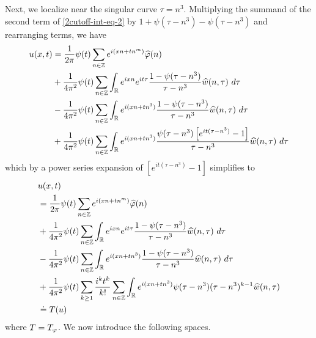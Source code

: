 %
%
%
%
%
Next, we localize near the singular curve $\tau =  n^3$.  Multiplying the
summand of the second term of \eqref{2cutoff-int-eq-2} by $1 + \psi(\tau -
n^3) - \psi(\tau -
n^3) $ and
rearranging terms, we have
%
%
\begin{equation*}
	\begin{split}
		 u(x, t)
		& = \frac{1}{2 \pi} \psi(t) \sum_{n \in \mathbb{Z}} e^{i(xn + t n^{m 
		})} \widehat{\varphi}(n) 
		\\
		& + \frac{1}{4 \pi^2} \psi(t) \sum_{n \in \mathbb{Z}} \int_{\mathbb{R}} e^{ixn}  
		e^{it \tau} \frac{1 - \psi(\tau - n^3) 
		}{\tau - n^3} \widehat{w}(n, \tau) \ d \tau
		\\
		& - \frac{1}{4 \pi^2} \psi(t) \sum_{n \in \mathbb{Z}} \int _{\mathbb{R}} e^{i(xn + 
		t n^3)}
		 \frac{1- \psi(\tau - n^3)}{\tau - n^3} \widehat{w}(n, \tau) \ d \tau
		\\
		& + \frac{1}{4 \pi^2} \psi(t) \sum_{n \in \mathbb{Z}} \int_{\mathbb{R}}
		e^{i(xn + t n^3)}
		\frac{\psi(\tau - n^3)\left[ e^{it(\tau - n^3)}-1 
		\right]}{\tau - n^3} \widehat{w}(n, \tau) \ d \tau
	\end{split}
\end{equation*}
%
%
which by a power series expansion of $[e^{it(\tau - n^3)}-1]$ simplifies  
to
%
%
\begin{align}
	\label{2main-int-expression-0}
	& u(x, t) 
		\\
		\label{2main-int-expression-1}
		& = \frac{1}{2 \pi} \psi(t) \sum_{n \in \mathbb{Z}} e^{i(xn + tn^{m 
		})} \widehat{\varphi}(n) 
		\\
		\label{2main-int-expression-2}
		& + \frac{1}{4 \pi^2} \psi(t) \sum_{n\in \mathbb{Z}} \int_{\mathbb{R}} e^{ixn}  
		e^{it \tau} \frac{1 - \psi(\tau -  n^3) 
		}{\tau -  n^3} \widehat{w}(n, \tau) \ d \tau
		\\
		\label{2main-int-expression-3}
		& - \frac{1}{4 \pi^2} \psi(t) \sum_{n\in \mathbb{Z}} \int_{\mathbb{R}} e^{i(xn + 
		t n^3)}
		 \frac{1- \psi(\tau -  n^3)}{\tau -  n^3} \widehat{w}(n, \tau) \ d \tau
		\\
		\label{2main-int-expression-4}
		& + \frac{1}{4 \pi^2} \psi(t) \sum_{k \ge 1} \frac{i^k t^k}{k!}
		\sum_{n \in \mathbb{Z}} \int_{\mathbb{R}} e^{i(xn + t n^3 )}
		\psi(\tau -  n^3) (\tau -  n^3)^{k-1} \widehat{w}(n, \tau)  
		\\
		& \doteq T(u) \notag
\end{align}
%
%
where $T = T_{\varphi}$. We now introduce the following spaces. 

